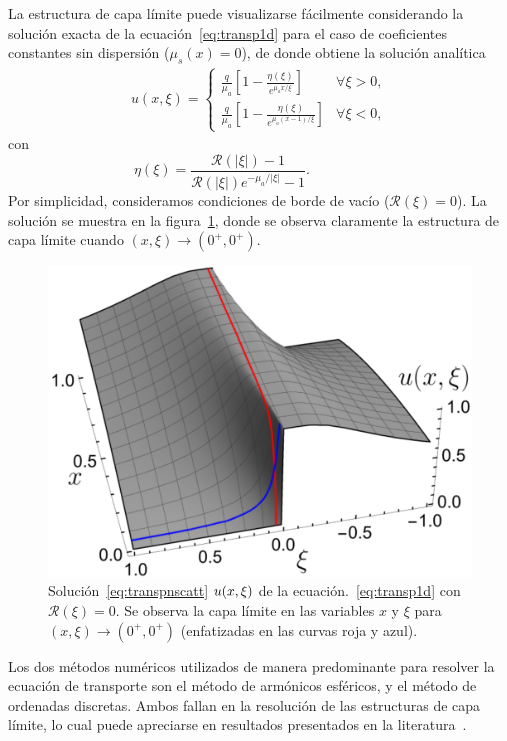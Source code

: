 La estructura de capa límite puede visualizarse fácilmente 
considerando la solución exacta de la ecuación~\eqref{eq:transp1d} 
para el caso de coeficientes constantes sin dispersión ($\mu_s(x)=0$), 
de donde obtiene la solución analítica 
\begin{equation}
\begin{split}
u(x,\xi)=\begin{cases}
\displaystyle \frac{q}{\mu_a}\left[1-\frac{\eta(\xi)}{ e^{\mu_a x / \xi}}\right]&\forall\xi>0,\\[8pt]
\displaystyle  \frac{q}{\mu_a}\left[1- \frac{\eta(\xi)}{e^{\mu_a (x-1) / \xi}} \right]&\forall\xi<0,
\end{cases}
\end{split}
\label{eq:transpnscatt}
\end{equation}
con
\begin{equation*}
\;\;\eta(\xi)=\frac{\mathcal{R}(|\xi|)-1}{\mathcal{R}(|\xi|)e^{-\mu_a/|\xi|}-1}.\qquad\qquad\qquad
\end{equation*}
Por simplicidad, consideramos condiciones de borde de vacío ($\mathcal{R}(\xi)=0$).
La solución se muestra en la figura~\ref{fig:ansol}, donde se observa claramente la estructura de capa 
límite cuando $(x,\xi) \to (0^+,0^+)$.
\begin{figure}[h!]
\centering
  \includegraphics[width=0.5\linewidth]{figuras/Analytic_lay_3.pdf}
  \caption{Solución~\eqref{eq:transpnscatt} $u(x,\xi)$ de la ecuación.~\eqref{eq:transp1d} con
  $\mathcal{R}(\xi)=0$. Se observa la capa límite en las variables $x$ y $\xi$ 
  para $(x,\xi) \to (0^+,0^+)$ (enfatizadas en las curvas roja y azul).}
 \label{fig:ansol}
\end{figure}

Los dos métodos numéricos utilizados de manera predominante 
para resolver la ecuación de transporte son 
el método de armónicos esféricos,  
y el método de ordenadas discretas. Ambos fallan 
en la resolución de las estructuras de capa límite, 
lo cual puede apreciarse en resultados presentados 
en la literatura~\cite{Rocheleau2020,Wang2019,Harel2020,Anli2006,Chai1993}.

